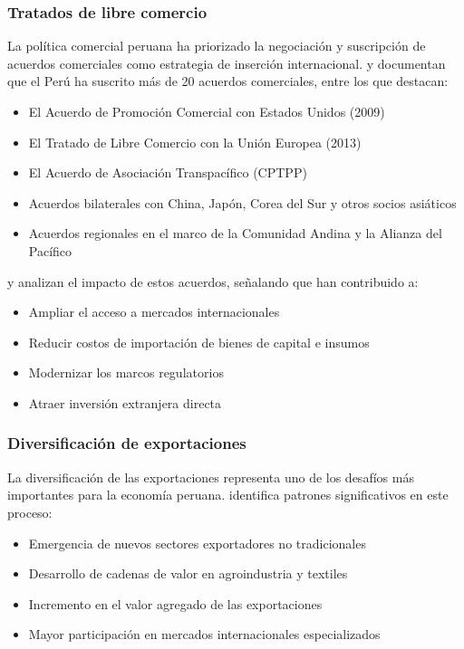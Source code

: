 \documentclass[12pt, a4paper]{article}
\begin{document}
\subsubsection{Tratados de libre comercio}
La política comercial peruana ha priorizado la negociación y suscripción de acuerdos comerciales como estrategia de inserción internacional. \textcite{ferrero2018} y \textcite{novak2019} documentan que el Perú ha suscrito más de 20 acuerdos comerciales, entre los que destacan:

\begin{itemize}
    \item El Acuerdo de Promoción Comercial con Estados Unidos (2009)
    \item El Tratado de Libre Comercio con la Unión Europea (2013)
    \item El Acuerdo de Asociación Transpacífico (CPTPP)
    \item Acuerdos bilaterales con China, Japón, Corea del Sur y otros socios asiáticos
    \item Acuerdos regionales en el marco de la Comunidad Andina y la Alianza del Pacífico
\end{itemize}

\textcite{garcia_belaunde2020} y \textcite{morales2021} analizan el impacto de estos acuerdos, señalando que han contribuido a:
\begin{itemize}
    \item Ampliar el acceso a mercados internacionales
    \item Reducir costos de importación de bienes de capital e insumos
    \item Modernizar los marcos regulatorios
    \item Atraer inversión extranjera directa
\end{itemize}

\subsubsection{Diversificación de exportaciones}
La diversificación de las exportaciones representa uno de los desafíos más importantes para la economía peruana. \textcite{alarco2021} identifica patrones significativos en este proceso:

\begin{itemize}
    \item Emergencia de nuevos sectores exportadores no tradicionales
    \item Desarrollo de cadenas de valor en agroindustria y textiles
    \item Incremento en el valor agregado de las exportaciones
    \item Mayor participación en mercados internacionales especializados
\end{itemize}
\end{document}
